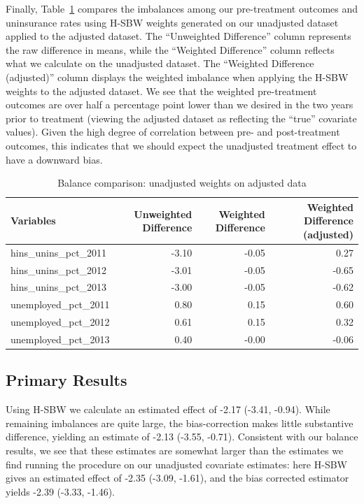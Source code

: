 \documentclass[aoas]{imsart}
\theoremstyle{plain}
\theoremstyle{remark}
\begin{document}
Finally, Table~\ref{tab:balcomp} compares the imbalances among our pre-treatment outcomes and uninsurance rates using H-SBW weights generated on our unadjusted dataset applied to the adjusted dataset. The ``Unweighted Difference'' column represents the raw difference in means, while the ``Weighted Difference'' column reflects what we calculate on the unadjusted dataset. The ``Weighted Difference (adjusted)'' column displays the weighted imbalance when applying the H-SBW weights to the adjusted dataset. We see that the weighted pre-treatment outcomes are over half a percentage point lower than we desired in the two years prior to treatment (viewing the adjusted dataset as reflecting the ``true'' covariate values). Given the high degree of correlation between pre- and post-treatment outcomes, this indicates that we should expect the unadjusted treatment effect to have a downward bias.

\begin{table}[ht]
\label{tab:balcomp}
\caption{Balance comparison: unadjusted weights on adjusted data}
\begin{tabular}{lrrr}
  \hline
Variables & Unweighted Difference & Weighted Difference & Weighted Difference (adjusted) \\ 
  \hline
hins\_unins\_pct\_2011 & -3.10 & -0.05 & 0.27 \\ 
  hins\_unins\_pct\_2012 & -3.01 & -0.05 & -0.65 \\ 
  hins\_unins\_pct\_2013 & -3.00 & -0.05 & -0.62 \\ 
  unemployed\_pct\_2011 & 0.80 & 0.15 & 0.60 \\ 
  unemployed\_pct\_2012 & 0.61 & 0.15 & 0.32 \\ 
  unemployed\_pct\_2013 & 0.40 & -0.00 & -0.06 \\ 
   \hline
\end{tabular}
\end{table}

\subsection{Primary Results}

Using H-SBW we calculate an estimated effect of -2.17 (-3.41, -0.94). While remaining imbalances are quite large, the bias-correction makes little substantive difference, yielding an estimate of -2.13 (-3.55, -0.71). Consistent with our balance results, we see that these estimates are somewhat larger than the estimates we find running the procedure on our unadjusted covariate estimates: here H-SBW gives an estimated effect of -2.35 (-3.09, -1.61), and the bias corrected estimator yields -2.39 (-3.33, -1.46). 
\end{document}
